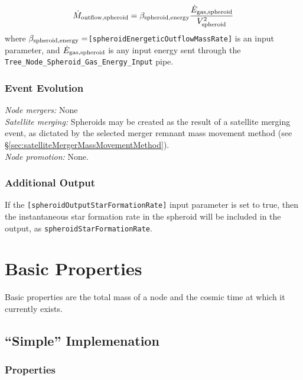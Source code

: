 \begin{equation}
 \dot{M}_{\rm outflow, spheroid} = \beta_{\rm spheroid, energy} {\dot{E}_{\rm gas, spheroid} \over V_{\rm spheroid}^2}
\end{equation}
where $\beta_{\rm spheroid, energy}=${\tt [spheroidEnergeticOutflowMassRate]} is an input parameter, and $\dot{E}_{\rm gas,spheroid}$ is any input energy sent through the {\tt Tree\_Node\_Spheroid\_Gas\_Energy\_Input} pipe.

\subsubsection{Event Evolution}

\noindent\emph{Node mergers:} None\\

\noindent\emph{Satellite merging:} Spheroids may be created as the result of a satellite merging event, as dictated by the selected merger remnant mass movement method (see \S\ref{sec:satelliteMergerMassMovementMethod}).\\

\noindent\emph{Node promotion:} None.\\

\subsubsection{Additional Output}

If the {\tt [spheroidOutputStarFormationRate]} input parameter is set to true, then the instantaneous star formation rate in the spheroid will be included in the output, as {\tt spheroidStarFormationRate}.

\section{Basic Properties}\label{sec:ComponentBasicProperties}

Basic properties are the total mass of a node and the cosmic time at which it currently exists.

\subsection{``Simple'' Implemenation}

\subsubsection{Properties}

